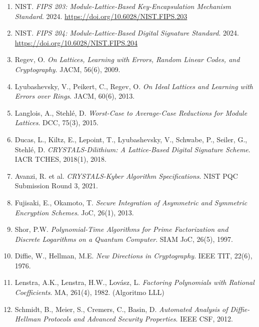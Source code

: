 \documentclass[12pt,a4paper,twoside,openright]{book}
\theoremstyle{plain}
\theoremstyle{definition}
\theoremstyle{remark}
\begin{document}
\begin{enumerate}
  \item NIST. \textit{FIPS 203: Module-Lattice-Based Key-Encapsulation
    Mechanism Standard}. 2024.
    \url{https://doi.org/10.6028/NIST.FIPS.203}

  \item NIST. \textit{FIPS 204: Module-Lattice-Based Digital Signature
    Standard}. 2024.
    \url{https://doi.org/10.6028/NIST.FIPS.204}

  \item Regev, O. \textit{On Lattices, Learning with Errors, Random Linear
    Codes, and Cryptography}. JACM, 56(6), 2009.

  \item Lyubashevsky, V., Peikert, C., Regev, O. \textit{On Ideal Lattices
    and Learning with Errors over Rings}. JACM, 60(6), 2013.

  \item Langlois, A., Stehl\'e, D. \textit{Worst-Case to Average-Case
    Reductions for Module Lattices}. DCC, 75(3), 2015.

  \item Ducas, L., Kiltz, E., Lepoint, T., Lyubashevsky, V., Schwabe, P.,
    Seiler, G., Stehl\'e, D. \textit{CRYSTALS-Dilithium: A Lattice-Based
    Digital Signature Scheme}. IACR TCHES, 2018(1), 2018.

  \item Avanzi, R. et al. \textit{CRYSTALS-Kyber Algorithm Specifications}.
    NIST PQC Submission Round 3, 2021.

  \item Fujisaki, E., Okamoto, T. \textit{Secure Integration of Asymmetric
    and Symmetric Encryption Schemes}. JoC, 26(1), 2013.

  \item Shor, P.W. \textit{Polynomial-Time Algorithms for Prime Factorization
    and Discrete Logarithms on a Quantum Computer}. SIAM JoC, 26(5), 1997.

  \item Diffie, W., Hellman, M.E. \textit{New Directions in Cryptography}.
    IEEE TIT, 22(6), 1976.

  \item Lenstra, A.K., Lenstra, H.W., Lov\'asz, L. \textit{Factoring
    Polynomials with Rational Coefficients}. MA, 261(4), 1982. (Algoritmo LLL)

  \item Schmidt, B., Meier, S., Cremers, C., Basin, D. \textit{Automated
    Analysis of Diffie-Hellman Protocols and Advanced Security Properties}.
    IEEE CSF, 2012.


\end{enumerate}
\end{document}
